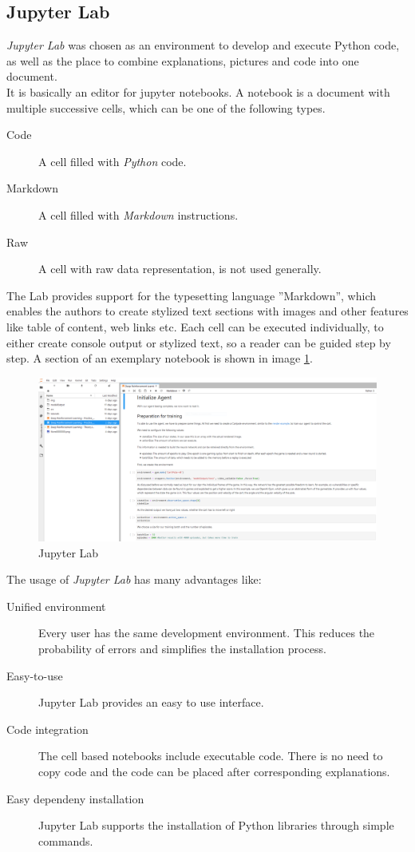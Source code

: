 \documentclass[10pt,a4paper]{article}
\begin{document}
		\subsection{Jupyter Lab}
		\textit{Jupyter Lab} was chosen as an environment to develop and execute Python code, as well as the place to combine explanations, pictures and code into one document.\\
		It is basically an editor for jupyter notebooks.
		A notebook is a document with multiple successive cells, which can be one of the following types. 	\begin{description}
			\item[Code] A cell filled with \textit{Python} code.
			\item[Markdown] A cell filled with \textit{Markdown} instructions.
			\item[Raw] A cell with raw data representation, is not used generally.
		\end{description} 
		The Lab provides support for the typesetting language ''Markdown'', which enables the authors to create stylized text sections with images and other features like table of content, web links etc.
		Each cell can be executed individually, to either create console output or stylized text, so a reader can be guided step by step.
		A section of an exemplary notebook is shown in image \ref{jupLab}.\\
			\begin{figure}[h!]
			\begin{center}
				\includegraphics[width=\linewidth]{img/jupLab.png}
				\caption{Jupyter Lab}
				\label{jupLab}
			\end{center}
		\end{figure}
		The usage of \textit{Jupyter Lab} has many advantages like:
		\begin{description}
			\item [Unified environment] Every user has the same development environment. This reduces the probability of errors and simplifies the installation process.
			\item[Easy-to-use] Jupyter Lab provides an easy to use interface.
			\item[Code integration] The cell based notebooks include executable code. There is no need to copy code and the code can be placed after corresponding explanations.
			\item[Easy dependeny installation] Jupyter Lab supports the installation of Python libraries through simple commands.
		\end{description}
\end{document}
